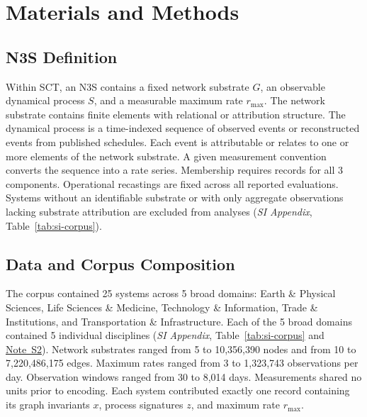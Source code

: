 \documentclass{article}
\begin{document}
\section*{Materials and Methods}
\label{sec:methods}

\subsection*{N3S Definition}
Within SCT, an N3S contains a fixed network substrate $G$, an observable dynamical process $S$, and a measurable maximum rate $r_{\max}$. The network substrate contains finite elements with relational or attribution structure. The dynamical process is a time-indexed sequence of observed events or reconstructed events from published schedules. Each event is attributable or relates to one or more elements of the network substrate. A given measurement convention converts the sequence into a rate series. Membership requires records for all 3 components. Operational recastings are fixed across all reported evaluations. Systems without an identifiable substrate or with only aggregate observations lacking substrate attribution are excluded from analyses (\textit{SI Appendix}, Table~\ref{tab:si-corpus}).

\subsection*{Data and Corpus Composition}
The corpus contained 25 systems across 5 broad domains: Earth \& Physical Sciences, Life Sciences \& Medicine, Technology \& Information, Trade \& Institutions, and Transportation \& Infrastructure. Each of the 5 broad domains contained 5 individual disciplines (\textit{SI Appendix}, Table~\ref{tab:si-corpus} and \hyperref[sec:si-note-processing]{Note~S2}). Network substrates ranged from 5 to 10,356,390 nodes and from 10 to 7,220,486,175 edges. Maximum rates ranged from 3 to 1,323,743 observations per day. Observation windows ranged from 30 to 8,014 days. Measurements shared no units prior to encoding. Each system contributed exactly one record containing its graph invariants $x$, process signatures $z$, and maximum rate $r_{\max}$.
\end{document}
